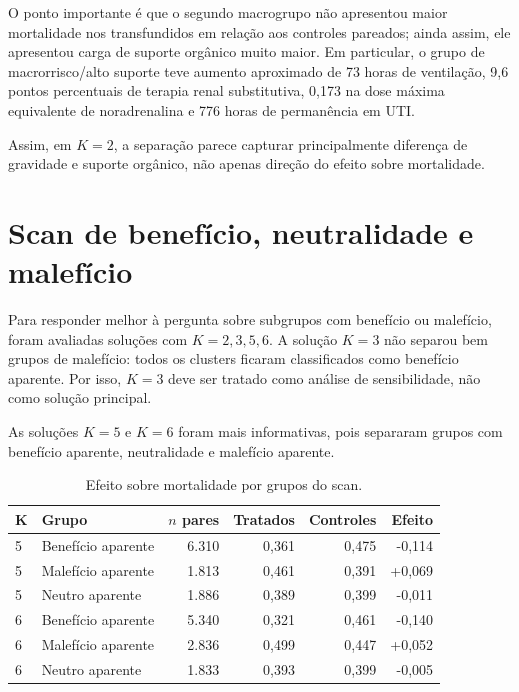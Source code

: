 \documentclass[12pt,a4paper]{article}
\begin{document}
O ponto importante \'e que o segundo macrogrupo n\~ao apresentou maior mortalidade nos transfundidos em rela\c{c}\~ao aos controles pareados; ainda assim, ele apresentou carga de suporte org\^anico muito maior. Em particular, o grupo de macrorrisco/alto suporte teve aumento aproximado de 73 horas de ventila\c{c}\~ao, 9,6 pontos percentuais de terapia renal substitutiva, 0,173 na dose m\'axima equivalente de noradrenalina e 776 horas de perman\^encia em UTI.

Assim, em $K=2$, a separa\c{c}\~ao parece capturar principalmente diferen\c{c}a de gravidade e suporte org\^anico, n\~ao apenas dire\c{c}\~ao do efeito sobre mortalidade.

\section{Scan de benef\'icio, neutralidade e malef\'icio}

Para responder melhor \`a pergunta sobre subgrupos com benef\'icio ou malef\'icio, foram avaliadas solu\c{c}\~oes com $K=2,3,5,6$. A solu\c{c}\~ao $K=3$ n\~ao separou bem grupos de malef\'icio: todos os clusters ficaram classificados como benef\'icio aparente. Por isso, $K=3$ deve ser tratado como an\'alise de sensibilidade, n\~ao como solu\c{c}\~ao principal.

As solu\c{c}\~oes $K=5$ e $K=6$ foram mais informativas, pois separaram grupos com benef\'icio aparente, neutralidade e malef\'icio aparente.

\begin{table}[ht]
\centering
\caption{Efeito sobre mortalidade por grupos do scan.}
\begin{tabular}{llrrrr}
\toprule
K & Grupo & $n$ pares & Tratados & Controles & Efeito \\
\midrule
5 & Benef\'icio aparente & 6.310 & 0,361 & 0,475 & -0,114 \\
5 & Malef\'icio aparente & 1.813 & 0,461 & 0,391 & +0,069 \\
5 & Neutro aparente & 1.886 & 0,389 & 0,399 & -0,011 \\
\midrule
6 & Benef\'icio aparente & 5.340 & 0,321 & 0,461 & -0,140 \\
6 & Malef\'icio aparente & 2.836 & 0,499 & 0,447 & +0,052 \\
6 & Neutro aparente & 1.833 & 0,393 & 0,399 & -0,005 \\
\bottomrule
\end{tabular}
\end{table}
\end{document}
